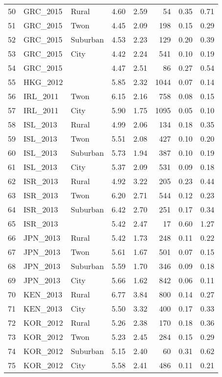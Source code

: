 \begin{table}[ht]
\begin{tabular}{rllrrrrr}
  50 & GRC\_2015 & Rural & 4.60 & 2.59 &  54 & 0.35 & 0.71 \\ 
  51 & GRC\_2015 & Twon & 4.45 & 2.09 & 198 & 0.15 & 0.29 \\ 
  52 & GRC\_2015 & Suburban & 4.53 & 2.23 & 129 & 0.20 & 0.39 \\ 
  53 & GRC\_2015 & City & 4.42 & 2.24 & 541 & 0.10 & 0.19 \\ 
  54 & GRC\_2015 &  & 4.47 & 2.51 &  86 & 0.27 & 0.54 \\ 
  55 & HKG\_2012 &  & 5.85 & 2.32 & 1044 & 0.07 & 0.14 \\ 
  56 & IRL\_2011 & Twon & 6.15 & 2.16 & 758 & 0.08 & 0.15 \\ 
  57 & IRL\_2011 & City & 5.90 & 1.75 & 1095 & 0.05 & 0.10 \\ 
  58 & ISL\_2013 & Rural & 4.99 & 2.06 & 134 & 0.18 & 0.35 \\ 
  59 & ISL\_2013 & Twon & 5.51 & 2.08 & 427 & 0.10 & 0.20 \\ 
  60 & ISL\_2013 & Suburban & 5.73 & 1.94 & 387 & 0.10 & 0.19 \\ 
  61 & ISL\_2013 & City & 5.37 & 2.09 & 531 & 0.09 & 0.18 \\ 
  62 & ISR\_2013 & Rural & 4.92 & 3.22 & 205 & 0.23 & 0.44 \\ 
  63 & ISR\_2013 & Twon & 6.20 & 2.71 & 544 & 0.12 & 0.23 \\ 
  64 & ISR\_2013 & Suburban & 6.42 & 2.70 & 251 & 0.17 & 0.34 \\ 
  65 & ISR\_2013 &  & 5.42 & 2.47 &  17 & 0.60 & 1.27 \\ 
  66 & JPN\_2013 & Rural & 5.42 & 1.73 & 248 & 0.11 & 0.22 \\ 
  67 & JPN\_2013 & Twon & 5.61 & 1.67 & 501 & 0.07 & 0.15 \\ 
  68 & JPN\_2013 & Suburban & 5.59 & 1.70 & 346 & 0.09 & 0.18 \\ 
  69 & JPN\_2013 & City & 5.66 & 1.62 & 842 & 0.06 & 0.11 \\ 
  70 & KEN\_2013 & Rural & 6.77 & 3.84 & 800 & 0.14 & 0.27 \\ 
  71 & KEN\_2013 & City & 5.50 & 3.32 & 400 & 0.17 & 0.33 \\ 
  72 & KOR\_2012 & Rural & 5.26 & 2.38 & 170 & 0.18 & 0.36 \\ 
  73 & KOR\_2012 & Twon & 5.23 & 2.45 & 284 & 0.15 & 0.29 \\ 
  74 & KOR\_2012 & Suburban & 5.15 & 2.40 &  60 & 0.31 & 0.62 \\ 
  75 & KOR\_2012 & City & 5.58 & 2.41 & 486 & 0.11 & 0.21 \\ 

\end{tabular}
\end{table}
